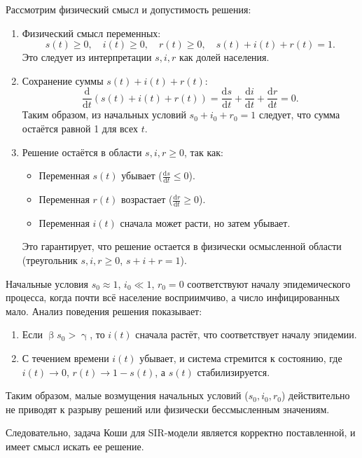 \documentclass[a4paper, 14pt]{extreport}
\numberwithin{equation}{section}
\renewcommand{\leq}{\leqslant}
\renewcommand{\geq}{\geqslant}
\renewcommand{\beta}{\upbeta}
\renewcommand{\gamma}{\upgamma}
\begin{document}
	Рассмотрим физический смысл и допустимость решения:
	\begin{enumerate}
		\item Физический смысл переменных:
		\[
		s(t) \geq 0, \quad i(t) \geq 0, \quad r(t) \geq 0, \quad s(t) + i(t) + r(t) = 1.
		\]
		Это следует из интерпретации \( s, i, r \) как долей населения. 
		\item Сохранение суммы \( s(t) + i(t) + r(t) \):
		\[
		\frac{\mathrm{d}}{\mathrm{d}t}(s(t) + i(t) + r(t)) = \frac{\mathrm{d}s}{\mathrm{d}t} + \frac{\mathrm{d}i}{\mathrm{d}t} + \frac{\mathrm{d}r}{\mathrm{d}t} = 0.
		\]
		Таким образом, из начальных условий \( s_0 + i_0 + r_0 = 1 \) следует, что сумма остаётся равной 1 для всех \( t \).
		\item 
		Решение остаётся в области \( s, i, r \geq 0 \), так как:
		\begin{itemize}
			\item Переменная \( s(t) \) убывает (\( \frac{\mathrm{d}s}{\mathrm{d}t} \leq 0 \)).
			\item Переменная \( r(t) \) возрастает (\( \frac{\mathrm{d}r}{\mathrm{d}t} \geq 0 \)).
			\item Переменная \( i(t) \) сначала может расти, но затем убывает.
		\end{itemize}
		Это гарантирует, что решение остается в физически осмысленной области (треугольник $s,i,r \geq 0$, $s+i+r = 1$).
	\end{enumerate}
	
	Начальные условия \( s_0 \approx 1 \), \( i_0 \ll 1 \), \( r_0 = 0 \) соответствуют началу эпидемического процесса, когда почти всё население восприимчиво, а число инфицированных мало. Анализ поведения решения показывает:
	\begin{enumerate}
		\item Если \( \beta s_0 > \gamma \), то \( i(t) \) сначала растёт, что соответствует началу эпидемии.
		\item С течением времени \( i(t) \) убывает, и система стремится к состоянию, где \( i(t) \to 0 \), \( r(t) \to 1 - s(t) \), а \( s(t) \) стабилизируется.
	\end{enumerate}
		
	Таким образом, малые возмущения начальных условий (\( s_0, i_0, r_0 \)) действительно не приводят к разрыву решений или физически бессмысленным значениям.

	Следовательно, задача Коши для SIR-модели является корректно поставленной, и имеет смысл искать ее решение.
\end{document}
